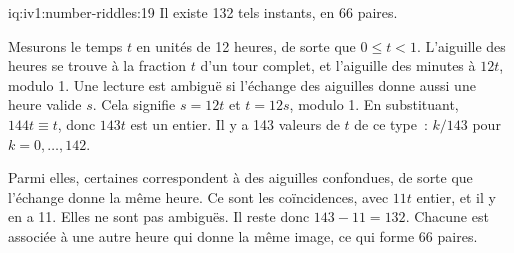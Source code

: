 \begin{solution}{iq:iv1:number-riddles:19}
Il existe 132 tels instants, en 66 paires.

Mesurons le temps $t$ en unités de 12 heures, de sorte que $0 \le t < 1$. L'aiguille des heures se trouve à la fraction $t$ d'un tour complet, et l'aiguille des minutes à $12t$, modulo 1. Une lecture est ambiguë si l'échange des aiguilles donne aussi une heure valide $s$. Cela signifie $s = 12t$ et $t = 12s$, modulo 1. En substituant, $144 t \equiv t$, donc $143 t$ est un entier. Il y a 143 valeurs de $t$ de ce type~: $k/143$ pour $k = 0, \dots, 142$.

Parmi elles, certaines correspondent à des aiguilles confondues, de sorte que l'échange donne la même heure. Ce sont les coïncidences, avec $11t$ entier, et il y en a 11. Elles ne sont pas ambiguës. Il reste donc $143 - 11 = 132$. Chacune est associée à une autre heure qui donne la même image, ce qui forme 66 paires.

\end{solution}

